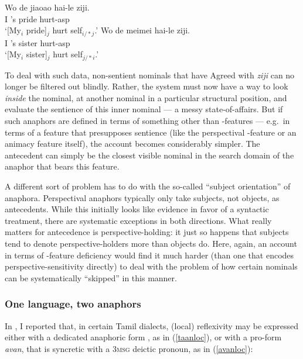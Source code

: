 \documentclass[output=paper, modfonts, nonflat]{langsci/langscibook}
\begin{document}
 \ea\label{sub}\gll Wo de jiaoao hai-le ziji.\\
 I 's pride hurt-{\sc asp} \anaph\\
 \glt `[My$_i$ pride]$_j$ hurt self$_{i/*j}$.'
 \ex\label{nosub}\gll Wo de meimei hai-le ziji.\\
 I 's sister hurt-{\sc asp} \anaph\\
 \glt `[My$_i$ sister]$_j$ hurt self$_{j/*i}$.'  \z

 \noindent To deal with such data, non-sentient nominals that have Agreed with
 \textit{ziji} can no longer be filtered out blindly.  Rather, the
 system must now have a way to look \emph{inside} the nominal, at
 another nominal in a particular structural position, and evaluate the
 sentience of this inner nominal --- a messy state-of-affairs. But if
 such anaphors are defined in terms of something other than \ph-features{}
 --- e.g.\ in terms of a feature that presupposes sentience (like the
 perspectival \dep-feature or an animacy feature itself), the
 account becomes considerably simpler. The antecedent can simply be
 the closest visible nominal in the search domain of the anaphor that
 bears this feature.%

 A different sort of problem has to do with the so-called ``subject
 orientation'' of anaphora. Perspectival anaphors typically only take
 subjects, not objects, as antecedents. While this initially looks
 like evidence in favor of a syntactic treatment, there are systematic
 exceptions in both directions. What really matters for antecedence is
 perspective-holding: it just so happens that subjects tend to
 denote perspective-holders more than objects do. Here, again, an
 account in terms of \ph-feature deficiency would find it much harder
 (than one that encodes perspective-sensitivity directly) to deal with
 the problem of how certain nominals can be systematically ``skipped''
 in this manner.



\subsubsection{One language, two anaphors}


In \citet[85, 84a-b]{sundaresan:2012}, I reported that, in
certain Tamil dialects, (local) reflexivity may be expressed either
with a dedicated anaphoric form \taan, as in (\ref{taanloc}), or with
a pro-form \textit{avan}, that is syncretic with a \textsc{3msg}
deictic pronoun, as in (\ref{avanloc}):
\end{document}
